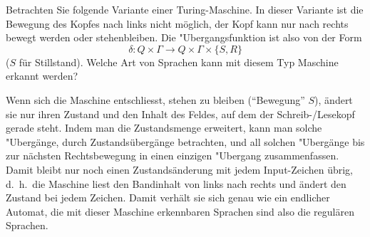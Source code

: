 Betrachten Sie folgende Variante einer Turing-Maschine. In dieser
Variante ist die Bewegung des Kopfes nach links nicht möglich,
der Kopf kann nur nach rechts bewegt werden oder stehenbleiben. Die
"Ubergangsfunktion ist also von der Form
$$\delta:Q\times \Gamma\to Q\times\Gamma\times \{S,R\}$$
($S$ für Stillstand). Welche Art von Sprachen kann mit diesem
Typ Maschine erkannt werden?

\begin{loesung}
Wenn sich die Maschine entschliesst, stehen zu bleiben (``Bewegung'' $S$),
ändert sie
nur ihren Zustand und den Inhalt des Feldes, auf dem der Schreib-/Lesekopf
gerade steht. Indem man die Zustandsmenge erweitert, kann man solche
"Ubergänge, durch Zustandsübergänge betrachten, und all solchen "Ubergänge
bis zur nächsten Rechtsbewegung in einen einzigen "Ubergang zusammenfassen.
Damit bleibt nur noch einen Zustandsänderung mit jedem Input-Zeichen
übrig, d.~h.~die Maschine liest den Bandinhalt von links nach rechts und
ändert den Zustand bei jedem Zeichen. Damit verhält sie sich genau
wie ein endlicher Automat, die mit dieser Maschine erkennbaren Sprachen
sind also die regulären Sprachen.
\end{loesung}
